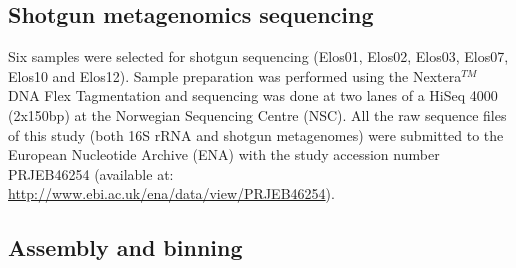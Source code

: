 \subsection{Shotgun metagenomics sequencing}

   Six samples were selected for shotgun sequencing (Elos01, Elos02, Elos03, Elos07, Elos10 and Elos12). 
   Sample preparation was performed using the Nextera$^{TM}$ DNA Flex Tagmentation and sequencing was done at two lanes of a HiSeq 4000 (2x150bp) at the Norwegian Sequencing Centre (NSC). 
   All the raw sequence files of this study (both 16S rRNA and shotgun metagenomes) were submitted to the European Nucleotide Archive (ENA) \citep{cummins_european_2022} with the study accession number PRJEB46254 
   (available at: \\ \href{http://www.ebi.ac.uk/ena/data/view/PRJEB46254}{http://www.ebi.ac.uk/ena/data/view/PRJEB46254}).


\subsection{Assembly and binning}

